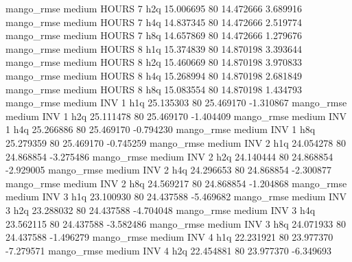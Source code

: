        mango_rmse     medium    HOURS                 7                  h2q 15.006695 80      14.472666           3.689916
       mango_rmse     medium    HOURS                 7                  h4q 14.837345 80      14.472666           2.519774
       mango_rmse     medium    HOURS                 7                  h8q 14.657869 80      14.472666           1.279676
       mango_rmse     medium    HOURS                 8                  h1q 15.374839 80      14.870198           3.393644
       mango_rmse     medium    HOURS                 8                  h2q 15.460669 80      14.870198           3.970833
       mango_rmse     medium    HOURS                 8                  h4q 15.268994 80      14.870198           2.681849
       mango_rmse     medium    HOURS                 8                  h8q 15.083554 80      14.870198           1.434793
       mango_rmse     medium      INV                 1                  h1q 25.135303 80      25.469170          -1.310867
       mango_rmse     medium      INV                 1                  h2q 25.111478 80      25.469170          -1.404409
       mango_rmse     medium      INV                 1                  h4q 25.266886 80      25.469170          -0.794230
       mango_rmse     medium      INV                 1                  h8q 25.279359 80      25.469170          -0.745259
       mango_rmse     medium      INV                 2                  h1q 24.054278 80      24.868854          -3.275486
       mango_rmse     medium      INV                 2                  h2q 24.140444 80      24.868854          -2.929005
       mango_rmse     medium      INV                 2                  h4q 24.296653 80      24.868854          -2.300877
       mango_rmse     medium      INV                 2                  h8q 24.569217 80      24.868854          -1.204868
       mango_rmse     medium      INV                 3                  h1q 23.100930 80      24.437588          -5.469682
       mango_rmse     medium      INV                 3                  h2q 23.288032 80      24.437588          -4.704048
       mango_rmse     medium      INV                 3                  h4q 23.562115 80      24.437588          -3.582486
       mango_rmse     medium      INV                 3                  h8q 24.071933 80      24.437588          -1.496279
       mango_rmse     medium      INV                 4                  h1q 22.231921 80      23.977370          -7.279571
       mango_rmse     medium      INV                 4                  h2q 22.454881 80      23.977370          -6.349693

